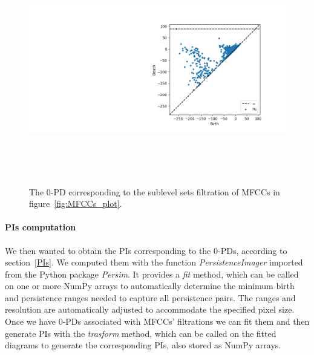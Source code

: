 \documentclass[english, LaM, oneside, noexaminfo]{sapthesis}
\begin{document}
\begin{figure}[tb]
\advance\leftskip-8cm
\includegraphics[height=10cm]{0-PD.png}
\caption{The $0$-PD corresponding to the sublevel sets filtration of MFCCs in figure~\ref{fig:MFCCs_plot}.}\label{fig:0-PD}
\end{figure}

\paragraph{PIs computation} We then wanted to obtain the PIs corresponding to the $0$-PDs, according to section~\ref{PIs}. We computed them with the function \textit{PersistenceImager} imported from the Python package \textit{Persim}. It provides a \textit{fit} method, which can be called on one or more NumPy arrays to automatically determine the minimum birth and persistence ranges needed to capture all persistence pairs. The ranges and resolution are automatically adjusted to accommodate the specified pixel size. Once we have $0$-PDs associated with MFCCs’ filtrations we can fit them and then generate PIs with the \textit{trasform} method, which can be called on the fitted diagrams to generate the corresponding PIs, also stored as NumPy arrays.
\end{document}

